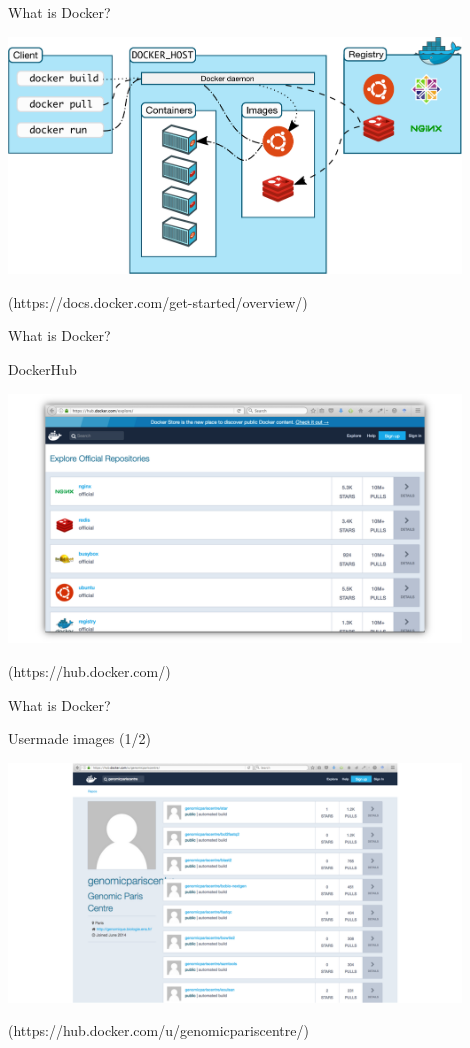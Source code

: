 \begin{frame}{What is Docker?}

\centering\includegraphics[width=12cm]{02_encapsulation/images/docker_architecture.pdf}

(https://docs.docker.com/get-started/overview/)
\end{frame}

\begin{frame}{What is Docker?}

DockerHub

\centering\includegraphics[width=12cm]{02_encapsulation/images/docker_dockerhub_offrep.png}

(https://hub.docker.com/)
\end{frame}

\begin{frame}{What is Docker?}

Usermade images (1/2)

\centering\includegraphics[width=12cm]{02_encapsulation/images/docker_dockerhub_gpc.png}

(https://hub.docker.com/u/genomicpariscentre/)
\end{frame}

